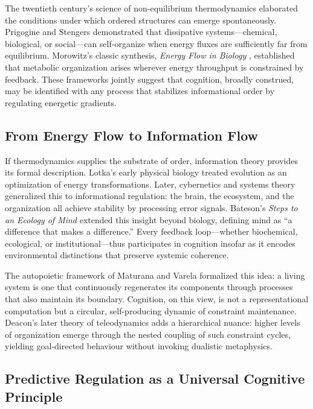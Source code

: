 \documentclass[11pt,a4paper]{article}
\begin{document}
The twentieth century’s science of non-equilibrium thermodynamics elaborated the conditions under which ordered structures can emerge spontaneously.  Prigogine and Stengers \citep{Prigogine1977SelfOrganizationNonequilibrium} demonstrated that dissipative systems---chemical, biological, or social---can self-organize when energy fluxes are sufficiently far from equilibrium.  Morowitz’s classic synthesis, \emph{Energy Flow in Biology} \citep{Morowitz1968EnergyFlowBiology}, established that metabolic organization arises wherever energy throughput is constrained by feedback.  These frameworks jointly suggest that cognition, broadly construed, may be identified with any process that stabilizes informational order by regulating energetic gradients.

\subsection{From Energy Flow to Information Flow}

If thermodynamics supplies the substrate of order, information theory provides its formal description.  Lotka’s early physical biology \citep{Lotka1922PhysicalBiology} treated evolution as an optimization of energy transformations.  Later, cybernetics and systems theory generalized this to informational regulation: the brain, the ecosystem, and the organization all achieve stability by processing error signals.  Bateson’s \emph{Steps to an Ecology of Mind} \citep{Bateson1972StepsToAnEcologyOfMind} extended this insight beyond biology, defining mind as ``a difference that makes a difference.''  Every feedback loop---whether biochemical, ecological, or institutional---thus participates in cognition insofar as it encodes environmental distinctions that preserve systemic coherence.

The autopoietic framework of Maturana and Varela \citep{MaturanaVarela1980Autopoiesis} formalized this idea: a living system is one that continuously regenerates its components through processes that also maintain its boundary.  Cognition, on this view, is not a representational computation but a circular, self-producing dynamic of constraint maintenance.  Deacon’s later theory of teleodynamics \citep{Deacon2011IncompleteNature} adds a hierarchical nuance: higher levels of organization emerge through the nested coupling of such constraint cycles, yielding goal-directed behaviour without invoking dualistic metaphysics.

\subsection{Predictive Regulation as a Universal Cognitive Principle}
\end{document}

